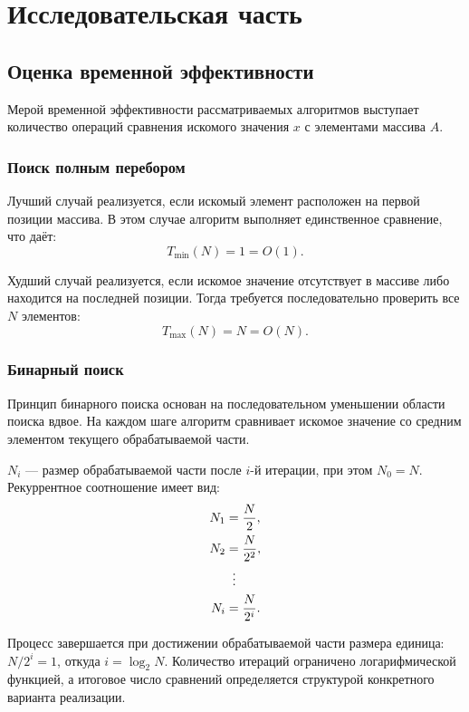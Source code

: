 \chapter{Исследовательская часть}

\section{Оценка временной эффективности}

Мерой временной эффективности рассматриваемых алгоритмов выступает количество операций сравнения искомого значения $x$ с элементами массива $A$.

\subsection{Поиск полным перебором}

Лучший случай реализуется, если искомый элемент расположен на первой позиции массива. В этом случае алгоритм выполняет единственное сравнение, что даёт:
\begin{equation}
	T_{\min}(N) = 1 = O(1).
\end{equation}

Худший случай реализуется, если искомое значение отсутствует в массиве либо находится на последней позиции. Тогда требуется последовательно проверить все $N$ элементов:
\begin{equation}
	T_{\max}(N) = N = O(N).
\end{equation}

\subsection{Бинарный поиск}

Принцип бинарного поиска основан на последовательном уменьшении области поиска вдвое. На каждом шаге алгоритм сравнивает искомое значение со средним элементом текущего обрабатываемой части.

$N_i$ --- размер обрабатываемой части после $i$-й итерации, при этом $N_0 = N$. Рекуррентное соотношение имеет вид:
\begin{align}
	N_1 &= \frac{N}{2}, \notag \\
	N_2 &= \frac{N}{2^2}, \notag \\
	&\;\;\vdots \notag \\
	N_i &= \frac{N}{2^i}.
\end{align}

Процесс завершается при достижении обрабатываемой части размера единица: $N / 2^i = 1$, откуда $i = \log_2 N$. Количество итераций ограничено логарифмической функцией, а итоговое число сравнений определяется структурой конкретного варианта реализации.

